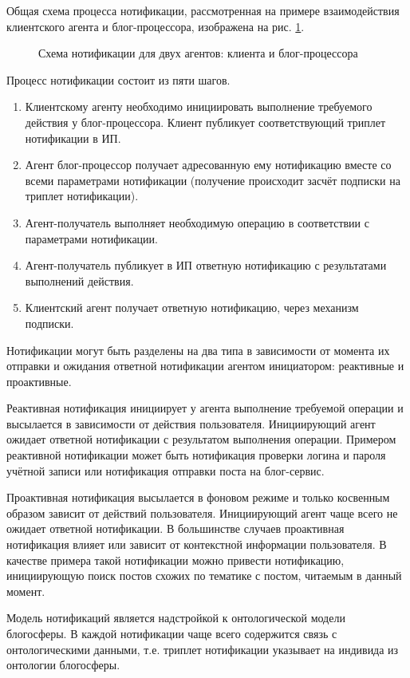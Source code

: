 Общая схема процесса нотификации, рассмотренная на примере взаимодействия клиентского агента и блог-процессора, изображена на рис. \ref{notification}.
\begin{figure}[h]
\centerline{
}
\caption{Схема нотификации для двух агентов: клиента и блог-процессора}
\label{notification}
\end{figure}
Процесс нотификации состоит из пяти шагов.
\begin{enumerate}
\item
Клиентскому агенту необходимо инициировать выполнение требуемого действия у блог-процессора. Клиент публикует соответствующий триплет нотификации в ИП.
\item
Агент блог-процессор получает адресованную ему нотификацию вместе со всеми параметрами нотификации (получение происходит засчёт подписки на триплет нотификации).
\item
Агент-получатель выполняет необходимую операцию в соответствии с параметрами нотификации.
\item
Агент-получатель публикует в ИП ответную нотификацию с результатами выполнений действия.
\item
Клиентский агент получает ответную нотификацию, через механизм подписки. 
\end{enumerate}

Нотификации могут быть разделены на два типа в зависимости от момента их отправки и ожидания ответной нотификации агентом инициатором: реактивные и проактивные.

Реактивная нотификация инициирует у агента выполнение требуемой операции и высылается в зависимости от действия пользователя. Инициирующий агент ожидает ответной нотификации с результатом выполнения операции. Примером реактивной нотификации может быть нотификация проверки логина и пароля учётной записи или нотификация отправки поста на блог-сервис.

Проактивная нотификация высылается в фоновом режиме и только косвенным образом зависит от действий пользователя. Инициирующий агент чаще всего не ожидает ответной нотификации. В большинстве случаев проактивная нотификация влияет или зависит от контекстной информации пользователя. В качестве примера такой нотификации можно привести нотификацию, инициирующую поиск постов схожих по тематике с постом, читаемым в данный момент.

Модель нотификаций является надстройкой к онтологической модели блогосферы. В каждой нотификации чаще всего содержится связь с онтологическими данными, т.е. триплет нотификации указывает на индивида из онтологии блогосферы.

